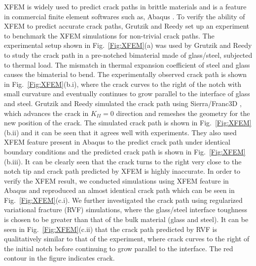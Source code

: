 \documentclass{article}
\begin{document}
XFEM is widely used to predict crack paths in brittle materials \cite{golewski2012numerical,barkai2012crack,peng2017extended} and is a feature in commercial finite element softwares such as, Abaqus \cite{abaqus2014}. To verify the ability of XFEM to predict accurate crack paths, Grutzik and Reedy \cite{grutzik2017development} set up an experiment to benchmark the XFEM simulations for non-trivial crack paths. The experimental setup shown in Fig.~\ref{Fig:XFEM}(a) was used by Grutzik and Reedy to study the crack path in a pre-notched bimaterial made of glass/steel, subjected to thermal load. 
The mismatch in thermal expansion coefficient of steel and glass causes the bimaterial to bend. The experimentally observed crack path is shown in Fig.~\ref{Fig:XFEM}(b.i), where the crack curves to the right of the notch with small curvature and eventually continues to grow parallel to the interface of glass and steel. 
Grutzik and Reedy simulated the crack path using Sierra/Franc3D \cite{Sierra,FRANC3D}, which advances the crack in $K_{II} = 0$ direction and remeshes the geometry for the new position of the crack. 
The simulated crack path is shown in Fig.~\ref{Fig:XFEM}(b.ii) and it can be seen that it agrees well with experiments. They also used XFEM feature present in Abaqus to the predict crack path under identical boundary conditions and the predicted crack path is shown in Fig.~\ref{Fig:XFEM}(b.iii). It can be clearly seen that the crack turns to the right very close to the notch tip and crack path predicted by XFEM is highly inaccurate. 
In order to verify the XFEM result, we conducted simulations using XFEM feature in Abaqus and reproduced an almost identical crack path which can be seen in Fig.~\ref{Fig:XFEM}(c.i). 
We further investigated the crack path using regularized variational fracture (RVF) simulations, where the glass/steel interface toughness is chosen to be greater than that of the bulk material (glass and steel). 
It can be seen in Fig.~\ref{Fig:XFEM}(c.ii) that the crack path predicted by RVF is qualitatively similar to that of the experiment, where crack curves to the right of the initial notch before continuing to grow parallel to the interface. The red contour in the figure indicates crack.
\end{document}
